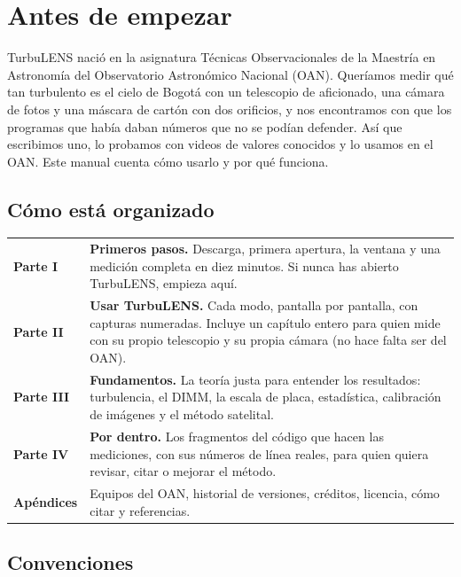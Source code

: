 \chapter*{Antes de empezar}

TurbuLENS nació en la asignatura Técnicas Observacionales de la Maestría en Astronomía del Observatorio Astronómico
Nacional (OAN). Queríamos medir qué tan turbulento es el cielo de Bogotá con un telescopio de aficionado, una cámara de
fotos y una máscara de cartón con dos orificios, y nos encontramos con que los programas que había daban números que no
se podían defender. Así que escribimos uno, lo probamos con videos de valores conocidos y lo usamos en el OAN. Este
manual cuenta cómo usarlo y por qué funciona.

\section*{Cómo está organizado}

\begin{center}\small
\begin{tabularx}{\linewidth}{@{}>{\bfseries\color{acento}}l Y@{}}
Parte I   & \textbf{Primeros pasos.} Descarga, primera apertura, la ventana y una medición completa en diez minutos.
            Si nunca has abierto TurbuLENS, empieza aquí.\\
Parte II  & \textbf{Usar TurbuLENS.} Cada modo, pantalla por pantalla, con capturas numeradas. Incluye un capítulo
            entero para quien mide con su propio telescopio y su propia cámara (no hace falta ser del OAN).\\
Parte III & \textbf{Fundamentos.} La teoría justa para entender los resultados: turbulencia, el DIMM, la escala de placa,
            estadística, calibración de imágenes y el método satelital.\\
Parte IV  & \textbf{Por dentro.} Los fragmentos del código que hacen las mediciones, con sus números de línea reales,
            para quien quiera revisar, citar o mejorar el método.\\
Apéndices & Equipos del OAN, historial de versiones, créditos, licencia, cómo citar y referencias.
\end{tabularx}
\end{center}

\section*{Convenciones}

